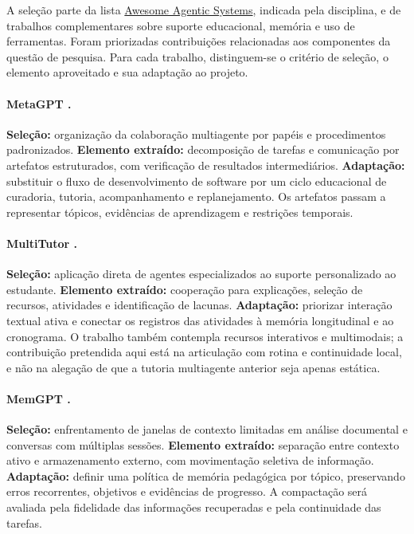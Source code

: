\documentclass[12pt]{article}
\begin{document}
A seleção parte da lista \href{https://juliodosreis.com/awesome-agenticsystems/}{Awesome Agentic Systems}, indicada pela disciplina, e de trabalhos complementares sobre suporte educacional, memória e uso de ferramentas. Foram priorizadas contribuições relacionadas aos componentes da questão de pesquisa. Para cada trabalho, distinguem-se o critério de seleção, o elemento aproveitado e sua adaptação ao projeto.

\paragraph{MetaGPT \citep{hong2024metagpt}.}
\textbf{Seleção:} organização da colaboração multiagente por papéis e procedimentos padronizados. \textbf{Elemento extraído:} decomposição de tarefas e comunicação por artefatos estruturados, com verificação de resultados intermediários. \textbf{Adaptação:} substituir o fluxo de desenvolvimento de software por um ciclo educacional de curadoria, tutoria, acompanhamento e replanejamento. Os artefatos passam a representar tópicos, evidências de aprendizagem e restrições temporais.

\paragraph{MultiTutor \citep{sun2025multitutor}.}
\textbf{Seleção:} aplicação direta de agentes especializados ao suporte personalizado ao estudante. \textbf{Elemento extraído:} cooperação para explicações, seleção de recursos, atividades e identificação de lacunas. \textbf{Adaptação:} priorizar interação textual ativa e conectar os registros das atividades à memória longitudinal e ao cronograma. O trabalho também contempla recursos interativos e multimodais; a contribuição pretendida aqui está na articulação com rotina e continuidade local, e não na alegação de que a tutoria multiagente anterior seja apenas estática.

\paragraph{MemGPT \citep{packer2023memgpt}.}
\textbf{Seleção:} enfrentamento de janelas de contexto limitadas em análise documental e conversas com múltiplas sessões. \textbf{Elemento extraído:} separação entre contexto ativo e armazenamento externo, com movimentação seletiva de informação. \textbf{Adaptação:} definir uma política de memória pedagógica por tópico, preservando erros recorrentes, objetivos e evidências de progresso. A compactação será avaliada pela fidelidade das informações recuperadas e pela continuidade das tarefas.
\end{document}
